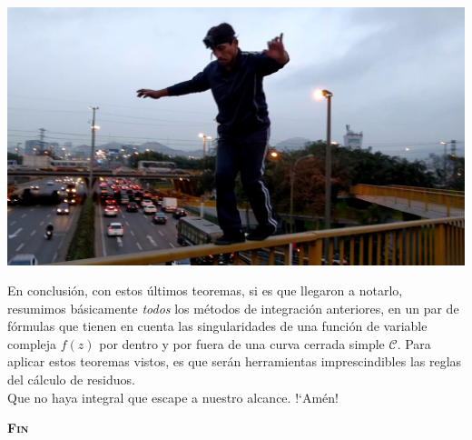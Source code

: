 \documentclass[12pt]{article}
\theoremstyle{definition}
\theoremstyle{theorem}
\theoremstyle{corolary}
\theoremstyle{method}
\begin{document}
\begin{center}
	\includegraphics[scale=0.2]{caminar.jpg}
\end{center}

En conclusi\'on, con estos \'ultimos teoremas, si es que llegaron a notarlo, resumimos b\'asicamente \textit{todos} los m\'etodos de integraci\'on anteriores, en un par de f\'ormulas que tienen en cuenta las singularidades de una funci\'on de variable compleja $f(z)$ por dentro y por fuera de una curva cerrada simple $\mathcal{C}$. Para aplicar estos teoremas vistos, es que ser\'an herramientas imprescindibles las reglas del c\'alculo de residuos.\\

Que no haya integral que escape a nuestro alcance. !`Am\'en!

\begin{center}
	\Large
	\textbf{\textsc{Fin}}
\end{center}
\end{document}
